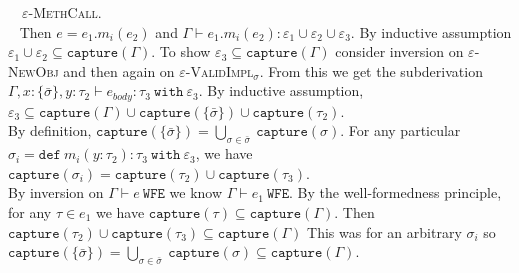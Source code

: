 \documentclass{llncs}
\newcommand{\keywadj}[1]{\mathtt{#1}}
\newcommand{\keyw}[1]{\keywadj{#1}~}
\newcommand{\kw}[1]{\keyw{ #1 }}
\newcommand{\kwa}[1]{\keywadj{ #1 }}
\newcommand{\proofcase}[2]{
	\begin{adjustwidth}{1.5em}{0pt}
		\fbox{Case.}~~#1. \\ ~#2
	\end{adjustwidth}
}
\begin{document}
{\proofcase{\textsc{$\varepsilon$-MethCall}}{
Then $e = e_1.m_i(e_2)$ and $\Gamma \vdash e_1.m_i(e_2) : \varepsilon_1 \cup \varepsilon_2 \cup \varepsilon_3$. By inductive assumption $\varepsilon_1 \cup \varepsilon_2 \subseteq \kwa{capture}(\Gamma)$. To show $\varepsilon_3 \subseteq \kwa{capture}(\Gamma)$ consider inversion on \textsc{$\varepsilon$-NewObj} and then again on \textsc{$\varepsilon$-ValidImpl$_\sigma$}. From this we get the subderivation $\Gamma, x : \{ \bar \sigma \}, y : \tau_2 \vdash e_{body} : \tau_3~\kw{with} \varepsilon_3$. By inductive assumption, $\varepsilon_3 \subseteq \kwa{capture}(\Gamma) \cup \kwa{capture}(\{ \bar \sigma \}) \cup \kwa{capture}(\tau_2)$. \\

\noindent
By definition, $\kwa{capture}(\{\bar \sigma\}) = \bigcup_{\sigma \in \bar \sigma}~\kwa{capture}(\sigma)$. For any particular $\sigma_i = \kw{def} m_i(y : \tau_2) : \tau_3~\kw{with} \varepsilon_3$, we have $\kwa{capture}(\sigma_i) = \kwa{capture}(\tau_2) \cup \kwa{capture}(\tau_3)$.  \\

\noindent
By inversion on $\Gamma \vdash e~\kwa{WFE}$ we know $\Gamma \vdash e_1~\kwa{WFE}$. 
 By the well-formedness principle, for any $\tau \in e_1$ we have $\kwa{capture}(\tau) \subseteq \kwa{capture}(\Gamma)$. Then $\kwa{capture}(\tau_2) \cup \kwa{capture}(\tau_3) \subseteq \kwa{capture}(\Gamma)$ This was for an arbitrary $\sigma_i$ so $\kwa{capture}(\{ \bar \sigma \}) = \bigcup_{\sigma \in \bar \sigma}~\kwa{capture}(\sigma) \subseteq \kwa{capture}(\Gamma)$.
}


~\\}
\end{document}

